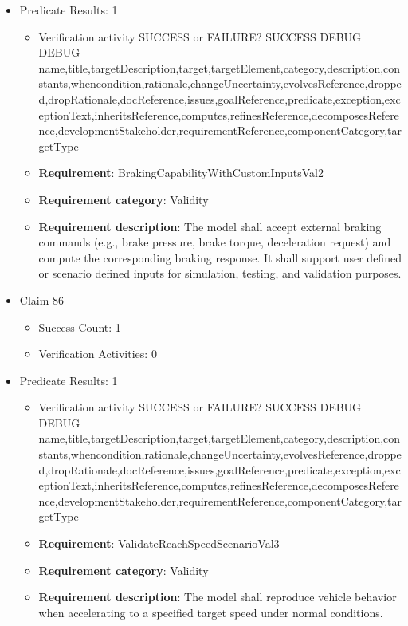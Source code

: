\documentclass{article}
\begin{document}
\begin{itemize}
									    
				\item Predicate Results: 1
					\begin{itemize}				
					\item Verification activity SUCCESS or FAILURE? SUCCESS
					DEBUG DEBUG name,title,targetDescription,target,targetElement,category,description,constants,whencondition,rationale,changeUncertainty,evolvesReference,dropped,dropRationale,docReference,issues,goalReference,predicate,exception,exceptionText,inheritsReference,computes,refinesReference,decomposesReference,developmentStakeholder,requirementReference,componentCategory,targetType
					\item \textbf{Requirement}: BrakingCapabilityWithCustomInputsVal2 
					\item \textbf{Requirement category}: Validity
					\item \textbf{Requirement description}: The model shall accept external braking commands (e.g., brake pressure, brake torque, deceleration request) and compute the corresponding braking response. It shall support user defined or scenario defined inputs for simulation, testing, and validation purposes.
					\end{itemize}

  				  \item Claim 86
				\begin{itemize}
			    	\item Success Count: 1 
			    	\item Verification Activities: 0
				\end{itemize}
				
									    
				\item Predicate Results: 1
					\begin{itemize}				
					\item Verification activity SUCCESS or FAILURE? SUCCESS
					DEBUG DEBUG name,title,targetDescription,target,targetElement,category,description,constants,whencondition,rationale,changeUncertainty,evolvesReference,dropped,dropRationale,docReference,issues,goalReference,predicate,exception,exceptionText,inheritsReference,computes,refinesReference,decomposesReference,developmentStakeholder,requirementReference,componentCategory,targetType
					\item \textbf{Requirement}: ValidateReachSpeedScenarioVal3 
					\item \textbf{Requirement category}: Validity
					\item \textbf{Requirement description}: The model shall reproduce vehicle behavior when accelerating to a specified target speed under normal conditions.
					\end{itemize}


\end{itemize}
\end{document}
